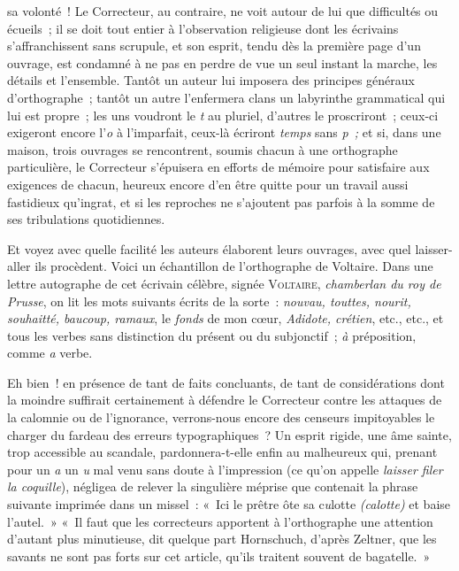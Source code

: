 \documentclass[french,twoside]{book} %
\begin{document}
sa volonté ! Le Correcteur, au contraire, ne voit autour de lui que difficultés ou écueils ; il se doit tout entier à l’observation religieuse dont les écrivains s’affranchissent sans scrupule, et son esprit, tendu dès la première page d’un ouvrage, est condamné à ne pas en perdre de vue un seul instant la marche, les détails et l’ensemble. Tantôt un auteur lui imposera des principes généraux d’orthographe ; tantôt un autre l’enfermera clans un labyrinthe grammatical qui lui est propre ; les uns voudront le \emph{t} au pluriel, d’autres le proscriront ; ceux-ci exigeront encore l’\emph{o} à l’imparfait, ceux-là écriront \emph{temps} sans \emph{p ;} et si, dans une maison, trois ouvrages se rencontrent, soumis chacun à une orthographe particulière, le Correcteur s’épuisera en efforts de mémoire pour satisfaire aux exigences de chacun, heureux encore d’en être quitte pour un travail aussi fastidieux qu’ingrat, et  si les reproches ne s’ajoutent pas parfois à la somme de ses tribulations quotidiennes.\par
Et voyez avec quelle facilité les auteurs élaborent leurs ouvrages, avec quel laisser-aller ils procèdent. Voici un échantillon de l’orthographe de Voltaire. Dans une lettre autographe de cet écrivain célèbre, signée V{\scshape oltaire}, \emph{chamberlan du roy de Prusse}, on lit les mots suivants écrits de la sorte : \emph{nouvau, touttes, nourit, souhaitté, baucoup, ramaux}, le \emph{fonds} de mon cœur, \emph{Adidote, crétien}, etc., etc., et tous les verbes sans distinction du présent ou du subjonctif ; \emph{à} préposition, comme \emph{a} verbe.\par
Eh bien ! en présence de tant de faits concluants, de tant de considérations dont la moindre suffirait certainement à défendre le Correcteur contre les attaques de la calomnie ou de l’ignorance, verrons-nous encore des censeurs impitoyables le charger du fardeau des erreurs typographiques ? Un  esprit rigide, une âme sainte, trop accessible au scandale, pardonnera-t-elle enfin au malheureux qui, prenant pour un \emph{a} un \emph{u} mal venu sans doute à l’impression (ce qu’on appelle \emph{laisser filer la coquille}), négligea de relever la singulière méprise que contenait la phrase suivante imprimée dans un missel : « Ici le prêtre ôte sa c\emph{u}lotte \emph{(c\emph{a}lotte)} et baise l’autel. » « Il faut que les correcteurs apportent à l’orthographe une attention d’autant plus minutieuse, dit quelque part Hornschuch, d’après Zeltner, que les savants ne sont pas forts sur cet article, qu’ils traitent souvent de bagatelle. »\par
\end{document}
